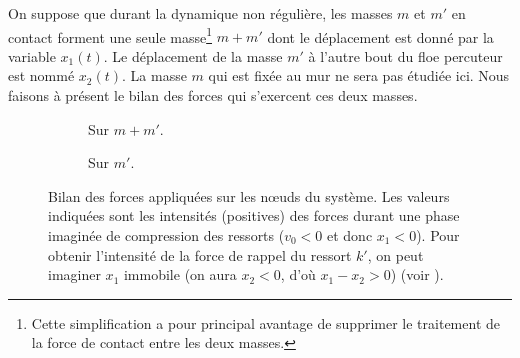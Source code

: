 \noindent On suppose que durant la dynamique non régulière, les masses $m$ et $m'$ en contact forment une seule masse\footnote{Cette simplification a pour principal avantage de supprimer le traitement de la force de contact entre les deux masses.}
$m+m'$ dont
le déplacement est donné par la variable $x_1(t)$. Le déplacement de la masse $m'$ à l'autre bout du floe percuteur est nommé
$x_2(t)$. La masse $m$ qui est fixée au mur ne sera pas étudiée ici. Nous faisons à présent le bilan des forces qui
s'exercent ces
deux masses.
\begin{figure}[!h]
     \begin{subfigure}[b]{0.4\textwidth}
         \centering
         \caption{Sur $m+m'$.}
         \label{fig:bilan11}
     \end{subfigure}
     \begin{subfigure}[b]{0.3\textwidth}
         \centering
         \caption{Sur $m'$.}
         \label{fig:bilan12}
     \end{subfigure}
        \caption{Bilan des forces appliquées sur les n\oe{}uds du système. Les valeurs indiquées sont les intensités
            (positives) des forces durant une phase imaginée de compression des ressorts ($v_0 <0$ et donc
            $x_1 <0$). Pour obtenir l'intensité de la force de rappel du ressort $k'$, on peut imaginer $x_1$ immobile
            (on aura $x_2 < 0$, d'où $x_1 - x_2 > 0$) (voir \parencite{homodeling}).}
        \label{fig:bilan}
\end{figure}

